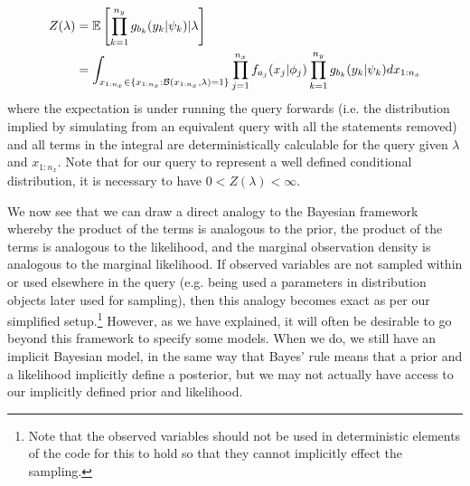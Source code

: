 \begin{align}
\label{eq:probprog:mod}
Z(\lambda) &= \mathbb{E} \left[ \prod_{k=1}^{n_y} g_{b_k}(y_k | \psi_k) | \lambda \right] \nonumber\\
&= \int_{x_{1:n_x} \in \{x_{1:n_x} : \mathcal{B}(x_{1:n_x},\lambda)=1\}} 
\prod_{j=1}^{n_x} f_{a_j}(x_j | \phi_j) \prod_{k=1}^{n_y} g_{b_k}(y_k | \psi_k) dx_{1:n_x}
\end{align}
where the expectation is under running the query forwards (i.e. the distribution implied by simulating
from an equivalent query with all the \observe statements removed) and 
all terms in the integral are deterministically calculable for the query given $\lambda$ and $x_{1:n_x}$.
Note that for our query to represent a well defined conditional distribution, it is necessary to have
$0<Z(\lambda)<\infty$.

We now see that we can draw a direct analogy to the Bayesian framework whereby the product of the
\sample terms is analogous to the prior, the product of the \observe terms is analogous to the
likelihood, and the marginal observation density is analogous to the marginal likelihood.  If observed variables
are not sampled within or used elsewhere in the query (e.g. being used a parameters in distribution objects
later used for sampling), then this analogy becomes exact as per our simplified setup.\footnote{Note that the
	observed variables should not be used in deterministic elements of the code for this to hold so that they
	cannot implicitly effect the sampling.}  However, as we have explained, it will often be desirable to go
beyond this framework to specify some models.  When we do, we still have an implicit Bayesian model, in the
same way that Bayes' rule means that a prior and a likelihood implicitly define a posterior, but we may not
actually have access to our implicitly defined prior and likelihood.

